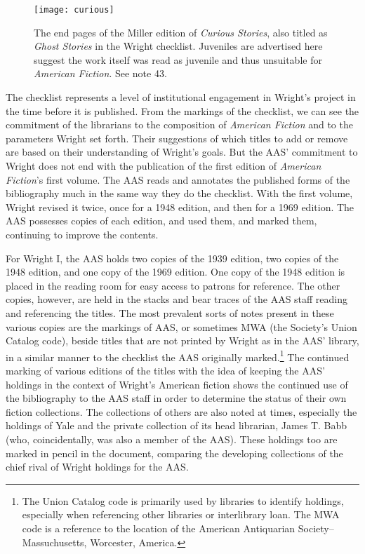 \begin{figure}
\texttt{[image: curious]}
\caption{The end pages of the Miller edition of \textit{Curious Stories}, also titled as \textit{Ghost Stories} in the Wright checklist. Juveniles are advertised here suggest the work itself was read as juvenile and thus unsuitable for \textit{American Fiction}. See note 43.}
\end{figure}
 
The checklist represents a level of institutional engagement in Wright's project in the time before it is published. From the markings of the checklist, we can see the commitment of the librarians to the composition of \textit{American Fiction} and to the parameters Wright set forth. Their suggestions of which titles to add or remove are based on their understanding of Wright's goals. But the AAS' commitment to Wright does not end with the publication of the first edition of \textit{American Fiction}'s first volume. The AAS reads and annotates the published forms of the bibliography much in the same way they do the checklist. With the first volume, Wright revised it twice, once for a 1948 edition, and then for a 1969 edition. The AAS possesses copies of each edition, and used them, and marked them, continuing to improve the contents. 

For Wright I, the AAS holds two copies of the 1939 edition, two copies of the 1948 edition, and one copy of the 1969 edition. One copy of the 1948 edition is placed in the reading room for easy access to patrons for reference. The other copies, however, are held in the stacks and bear traces of the AAS staff reading and referencing the titles. The most prevalent sorts of notes present in these various copies are the markings of AAS, or sometimes MWA (the Society's Union Catalog code), beside titles that are not printed by Wright as in the AAS' library, in a similar manner to the checklist the AAS originally marked.\footnote{The Union Catalog code is primarily used by libraries to identify holdings, especially when referencing other libraries or interlibrary loan. The MWA code is a reference to the location of the American Antiquarian Society--Massuchusetts, Worcester, America.} The continued marking of various editions of the titles with the idea of keeping the AAS' holdings in the context of Wright's American fiction shows the continued use of the bibliography to the AAS staff in order to determine the status of their own fiction collections. The collections of others are also noted at times, especially the holdings of Yale and the private collection of its head librarian, James T. Babb (who, coincidentally, was also a member of the AAS). These holdings too are marked in pencil in the document, comparing the developing collections of the chief rival of Wright holdings for the AAS. 

